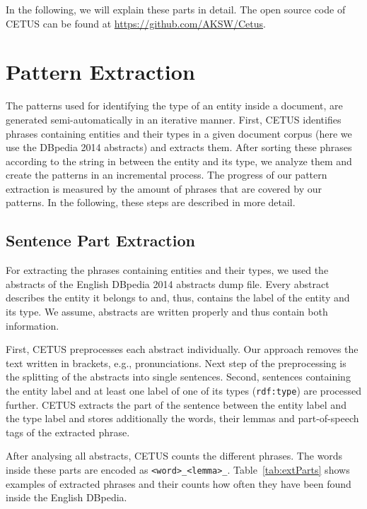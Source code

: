 In the following, we will explain these parts in detail.
The open source code of CETUS can be found at \url{https://github.com/AKSW/Cetus}.
\section{Pattern Extraction}
\label{sec:patternExt}

The patterns used for identifying the type of an entity inside a document, are generated semi-automatically in an iterative manner.
First, CETUS identifies phrases containing entities and their types in a given document corpus (here we use the DBpedia 2014 abstracts) and extracts them.
After sorting these phrases according to the string in between the entity and its type, we analyze them and create the patterns in an incremental process.
The progress of our pattern extraction is measured by the amount of phrases that are covered by our patterns.
In the following, these steps are described in more detail.

\subsection{Sentence Part Extraction}

For extracting the phrases containing entities and their types, we used the abstracts of the English DBpedia 2014 abstracts dump file.
Every abstract describes the entity it belongs to and, thus, contains the label of the entity and its type.
We assume, abstracts are written properly and thus contain both information.

First, CETUS preprocesses each abstract individually.
Our approach removes the text written in brackets, e.g., pronunciations.
Next step of the preprocessing is the splitting of the abstracts into single sentences.
Second, sentences containing the entity label and at least one label of one of its types (\texttt{rdf:type}) are processed further.
CETUS extracts the part of the sentence between the entity label and the type label and stores additionally the words, their lemmas and part-of-speech tags of the extracted phrase.

After analysing all abstracts, CETUS counts the different phrases.
The words inside these parts are encoded as \texttt{<word>\_<lemma>\_<pos-tag>}.
Table~\ref{tab:extParts} shows examples of extracted phrases and their counts how often they have been found inside the English DBpedia.

